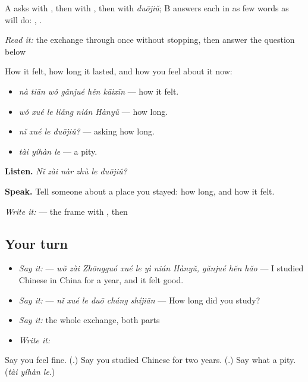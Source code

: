 A asks with , then with , then with \emph{duōjiǔ}; B answers each in as few words as will do: , .

\begin{tcolorbox}[breakable,skin=enhanced,colback=orange!6,colframe=orange!45!black,boxrule=0.5pt,arc=1mm,left=6pt,right=6pt,top=4pt,bottom=4pt,fonttitle=\bfseries,title={Read this}]
\emph{Read it:} the exchange through once without stopping, then answer the question below
\end{tcolorbox}

\begin{grammarlens}[title={What you've built — how it was}]
How it felt, how long it lasted, and how you feel about it now:

\begin{itemize}
\raggedright
  \item \textbf{} \emph{nà tiān wǒ gǎnjué hěn kāixīn} — how it felt.
  \item \textbf{} \emph{wǒ xué le liǎng nián Hànyǔ} — how long.
  \item \emph{nǐ xué le duōjiǔ?} — asking how long.
  \item \emph{tài yíhàn le} — a pity.
\end{itemize}

\textbf{Listen.} \emph{Nǐ zài nàr zhù le duōjiǔ?}

\textbf{Speak.} Tell someone about a place you stayed: how long, and how it felt.

\emph{Write it:}  — the frame with , then 
\end{grammarlens}

\subsection*{Your turn}
\begin{itemize}
\raggedright
  \item \emph{Say it:}   — \emph{wǒ zài Zhōngguó xué le yì nián Hànyǔ, gǎnjué hěn hǎo} — I studied Chinese in China for a year, and it felt good.
  \item \emph{Say it:}  — \emph{nǐ xué le duō cháng shíjiān} — How long did you study?
  \item \emph{Say it:} the whole exchange, both parts
  \item \emph{Write it:} 
\end{itemize}

\begin{tcolorbox}[breakable,colback=teal!4,colframe=teal!35!black,title={Before you move on}]
Say you feel fine. (\textbf{}.) Say you studied Chinese for two years. (\textbf{}.) Say what a pity. (\emph{tài yíhàn le}.)
\end{tcolorbox}
